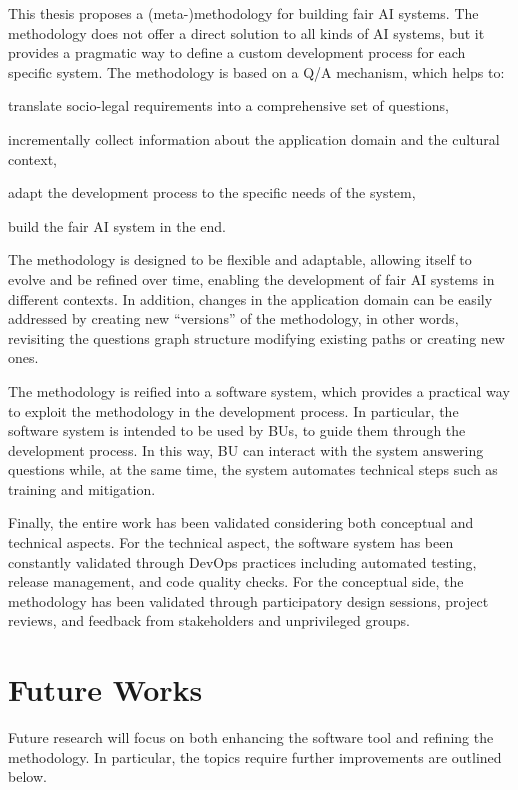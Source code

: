 \documentclass[12pt,a4paper,openright,twoside]{book}
\begin{document}
This thesis proposes a (meta-)methodology for building fair \ac{AI} systems.
%
The methodology does not offer a direct solution to all kinds of \ac{AI} systems, but it provides a pragmatic way to define a custom development process for each specific system.
%
The methodology is based on a \ac{Q/A} mechanism, which helps to:
\begin{enumerate*}[label=(\roman*)]
    \item translate socio-legal requirements into a comprehensive set of questions,
    \item incrementally collect information about the application domain and the cultural context,
    \item adapt the development process to the specific needs of the system,
    \item build the fair \ac{AI} system in the end.
\end{enumerate*}
%
The methodology is designed to be flexible and adaptable, allowing itself to evolve and be refined over time, enabling the development of fair \ac{AI} systems in different contexts.
%
In addition, changes in the application domain can be easily addressed by creating new ``versions'' of the methodology, in other words, revisiting the questions graph structure modifying existing paths or creating new ones.

The methodology is reified into a software system, which provides a practical way to exploit the methodology in the development process.
%
In particular, the software system is intended to be used by \acp{BU}, to guide them through the development process.
%
In this way, \ac{BU} can interact with the system answering questions while, at the same time, the system automates technical steps such as training and mitigation.

Finally, the entire work has been validated considering both conceptual and technical aspects.
%
For the technical aspect, the software system has been constantly validated through DevOps practices including automated testing, release management, and code quality checks.
%
For the conceptual side, the methodology has been validated through participatory design sessions, project reviews, and feedback from stakeholders and unprivileged groups.


\section{Future Works}

Future research will focus on both enhancing the software tool and refining the methodology.
%
In particular, the topics require further improvements are outlined below.
\end{document}
